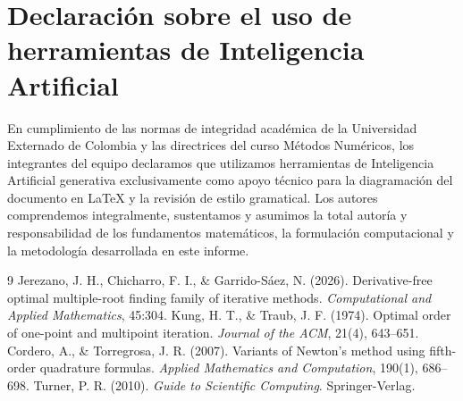 ﻿\documentclass[10pt, a4paper]{article}
\begin{document}
\section*{Declaración sobre el uso de herramientas de Inteligencia Artificial}
\small
En cumplimiento de las normas de integridad académica de la Universidad Externado de Colombia y las directrices del curso Métodos Numéricos, los integrantes del equipo declaramos que utilizamos herramientas de Inteligencia Artificial generativa exclusivamente como apoyo técnico para la diagramación del documento en \LaTeX{} y la revisión de estilo gramatical. Los autores comprendemos integralmente, sustentamos y asumimos la total autoría y responsabilidad de los fundamentos matemáticos, la formulación computacional y la metodología desarrollada en este informe.

\begin{thebibliography}{9}
\small
\setlength{\itemsep}{0pt}
 Jerezano, J. H., Chicharro, F. I., \& Garrido-Sáez, N. (2026). Derivative-free optimal multiple-root finding family of iterative methods. \textit{Computational and Applied Mathematics}, 45:304.
 Kung, H. T., \& Traub, J. F. (1974). Optimal order of one-point and multipoint iteration. \textit{Journal of the ACM}, 21(4), 643--651.
 Cordero, A., \& Torregrosa, J. R. (2007). Variants of Newton’s method using fifth-order quadrature formulas. \textit{Applied Mathematics and Computation}, 190(1), 686--698.
 Turner, P. R. (2010). \textit{Guide to Scientific Computing}. Springer-Verlag.
\end{thebibliography}
\end{document}
